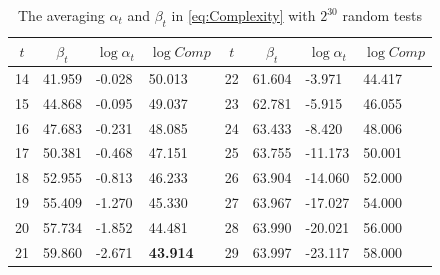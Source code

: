 \begin{table}[htbp]
  \centering
  \caption{The averaging $\alpha_t$ and $\beta_t$ in \eqref{eq:Complexity} with $2^{30}$ random tests}\label{tab:AlphaAndBeta}
    \begin{tabular}{|l|l|l|l|l|l|l|l|}
    \hline
    \multicolumn{1}{|c|}{$t$} & \multicolumn{1}{c|}{$\beta_t$} & \multicolumn{1}{c|}{$\log\alpha_t$} & \multicolumn{1}{c|}{$\log Comp$} & \multicolumn{1}{c|}{$t$} & \multicolumn{1}{c|}{$\beta_t$} & \multicolumn{1}{c|}{$\log\alpha_t$} & \multicolumn{1}{c|}{$\log Comp$} \\
    \hline

    14    & 41.959 & -0.028 & 50.013 & 22    & 61.604 & -3.971 & 44.417 \\
    \hline
    15    & 44.868 & -0.095 & 49.037 & 23    & 62.781 & -5.915 & 46.055 \\
    \hline
    16    & 47.683 & -0.231 & 48.085 & 24    & 63.433 & -8.420 & 48.006 \\
    \hline
    17    & 50.381 & -0.468 & 47.151 & 25    & 63.755 & -11.173 & 50.001 \\
    \hline
    18    & 52.955 & -0.813 & 46.233 & 26    & 63.904 & -14.060 & 52.000 \\
    \hline
    19    & 55.409 & -1.270 & 45.330 & 27    & 63.967 & -17.027 & 54.000 \\
    \hline
    20    & 57.734 & -1.852 & 44.481 & 28    & 63.990 & -20.021 & 56.000 \\
    \hline
    21    & 59.860 & -2.671 & \textbf{43.914} & 29    & 63.997 & -23.117 & 58.000 \\
    \hline

    \end{tabular}%
\end{table}%


